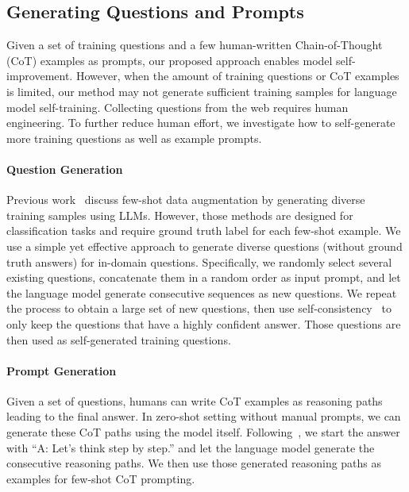 \subsection{Generating Questions and Prompts}\label{sec:q_gen}
Given a set of training questions and a few human-written Chain-of-Thought (CoT) examples as prompts, our proposed approach enables model self-improvement. However, when the amount of training questions or CoT examples is limited, our method may not generate sufficient training samples for language model self-training. Collecting questions from the web requires human engineering. 
To further reduce human effort, we investigate how to self-generate more training questions as well as example prompts. 

\paragraph{Question Generation}\label{sec:q_gen}
Previous work~\citep{Yoo2021GPT3MixLL, Meng2022GeneratingTD} discuss few-shot data augmentation by generating diverse training samples using LLMs. However, those methods are designed for classification tasks and require ground truth label for each few-shot example. We use a simple yet effective approach to generate diverse questions (without ground truth answers) for in-domain questions. Specifically, we randomly select several existing questions, concatenate them in a random order as input prompt, and let the language model generate consecutive sequences as new questions. We repeat the process to obtain a large set of new questions, then use self-consistency~\citep{Wang2022SelfConsistencyIC} to only keep the questions that have a highly confident answer. Those questions are then used as self-generated training questions.

\paragraph{Prompt Generation}
Given a set of questions, humans can write CoT examples as reasoning paths leading to the final answer. In zero-shot setting without manual prompts, we can generate these CoT paths using the model itself. Following~\cite{step_by_step}, we start the answer with ``A: Let's think step by step.'' and let the language model generate the consecutive reasoning paths. We then use those generated reasoning paths as examples for few-shot CoT prompting.